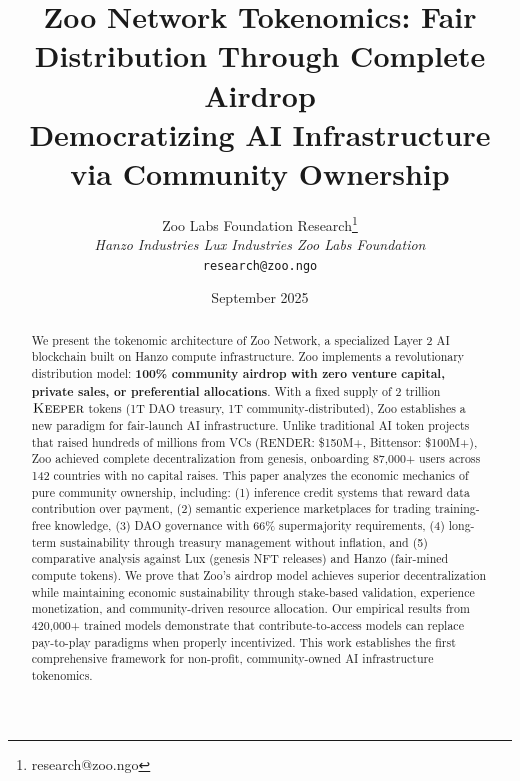 \documentclass[11pt,letterpaper]{article}
\title{\textbf{Zoo Network Tokenomics: Fair Distribution Through Complete Airdrop}\\
\large Democratizing AI Infrastructure via Community Ownership}
\author{
Zoo Labs Foundation Research\thanks{research@zoo.ngo}\\
\textit{Hanzo Industries \quad Lux Industries \quad Zoo Labs Foundation}\\
\texttt{research@zoo.ngo}
}
\date{September 2025}
\theoremstyle{definition}
\theoremstyle{remark}
\newcommand{\KEEPER}{\textsc{Keeper}}
\begin{document}
\zoocoverpage

\begin{abstract}
We present the tokenomic architecture of Zoo Network, a specialized Layer 2 AI blockchain built on Hanzo compute infrastructure. Zoo implements a revolutionary distribution model: \textbf{100\% community airdrop with zero venture capital, private sales, or preferential allocations}. With a fixed supply of 2 trillion $\KEEPER$ tokens (1T DAO treasury, 1T community-distributed), Zoo establishes a new paradigm for fair-launch AI infrastructure. Unlike traditional AI token projects that raised hundreds of millions from VCs (RENDER: \$150M+, Bittensor: \$100M+), Zoo achieved complete decentralization from genesis, onboarding 87,000+ users across 142 countries with no capital raises. This paper analyzes the economic mechanics of pure community ownership, including: (1) inference credit systems that reward data contribution over payment, (2) semantic experience marketplaces for trading training-free knowledge, (3) DAO governance with 66\% supermajority requirements, (4) long-term sustainability through treasury management without inflation, and (5) comparative analysis against Lux (genesis NFT releases) and Hanzo (fair-mined compute tokens). We prove that Zoo's airdrop model achieves superior decentralization while maintaining economic sustainability through stake-based validation, experience monetization, and community-driven resource allocation. Our empirical results from 420,000+ trained models demonstrate that contribute-to-access models can replace pay-to-play paradigms when properly incentivized. This work establishes the first comprehensive framework for non-profit, community-owned AI infrastructure tokenomics.
\end{abstract}

\tableofcontents
\newpage



















\end{document}
